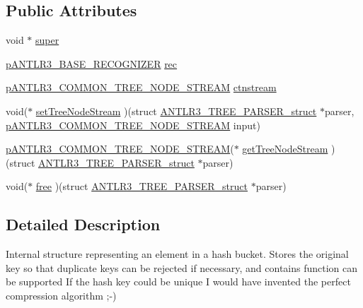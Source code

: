 \subsection*{Public Attributes}
\begin{DoxyCompactItemize}
\item 
void $\ast$ \hyperlink{struct_a_n_t_l_r3___t_r_e_e___p_a_r_s_e_r__struct_a747c1447b7ef0fc45034c6f25e1fdac0}{super}
\item 
\hyperlink{group___a_n_t_l_r3___b_a_s_e___r_e_c_o_g_n_i_z_e_r_ga5aeeb8dcbf65f45605ae07cbd618e24c}{p\-A\-N\-T\-L\-R3\-\_\-\-B\-A\-S\-E\-\_\-\-R\-E\-C\-O\-G\-N\-I\-Z\-E\-R} \hyperlink{struct_a_n_t_l_r3___t_r_e_e___p_a_r_s_e_r__struct_a2c91ea97da3628675b73dfd0818f697c}{rec}
\item 
\hyperlink{antlr3interfaces_8h_ad34592f16adc9c3df7eda33f9e35cd87}{p\-A\-N\-T\-L\-R3\-\_\-\-C\-O\-M\-M\-O\-N\-\_\-\-T\-R\-E\-E\-\_\-\-N\-O\-D\-E\-\_\-\-S\-T\-R\-E\-A\-M} \hyperlink{struct_a_n_t_l_r3___t_r_e_e___p_a_r_s_e_r__struct_a3c4fe4428b6684ed143062869673d215}{ctnstream}
\item 
void($\ast$ \hyperlink{struct_a_n_t_l_r3___t_r_e_e___p_a_r_s_e_r__struct_adb9beda70b2f18a08f6d9ed1ba93176b}{set\-Tree\-Node\-Stream} )(struct \hyperlink{struct_a_n_t_l_r3___t_r_e_e___p_a_r_s_e_r__struct}{A\-N\-T\-L\-R3\-\_\-\-T\-R\-E\-E\-\_\-\-P\-A\-R\-S\-E\-R\-\_\-struct} $\ast$parser, \hyperlink{antlr3interfaces_8h_ad34592f16adc9c3df7eda33f9e35cd87}{p\-A\-N\-T\-L\-R3\-\_\-\-C\-O\-M\-M\-O\-N\-\_\-\-T\-R\-E\-E\-\_\-\-N\-O\-D\-E\-\_\-\-S\-T\-R\-E\-A\-M} input)
\item 
\hyperlink{antlr3interfaces_8h_ad34592f16adc9c3df7eda33f9e35cd87}{p\-A\-N\-T\-L\-R3\-\_\-\-C\-O\-M\-M\-O\-N\-\_\-\-T\-R\-E\-E\-\_\-\-N\-O\-D\-E\-\_\-\-S\-T\-R\-E\-A\-M}($\ast$ \hyperlink{struct_a_n_t_l_r3___t_r_e_e___p_a_r_s_e_r__struct_a13ab4351ee6aaf51e18e26f2bddc109d}{get\-Tree\-Node\-Stream} )(struct \hyperlink{struct_a_n_t_l_r3___t_r_e_e___p_a_r_s_e_r__struct}{A\-N\-T\-L\-R3\-\_\-\-T\-R\-E\-E\-\_\-\-P\-A\-R\-S\-E\-R\-\_\-struct} $\ast$parser)
\item 
void($\ast$ \hyperlink{struct_a_n_t_l_r3___t_r_e_e___p_a_r_s_e_r__struct_a6b8657813c59e7f06b6a8f4ad6a0d240}{free} )(struct \hyperlink{struct_a_n_t_l_r3___t_r_e_e___p_a_r_s_e_r__struct}{A\-N\-T\-L\-R3\-\_\-\-T\-R\-E\-E\-\_\-\-P\-A\-R\-S\-E\-R\-\_\-struct} $\ast$parser)
\end{DoxyCompactItemize}


\subsection{Detailed Description}
Internal structure representing an element in a hash bucket. Stores the original key so that duplicate keys can be rejected if necessary, and contains function can be supported If the hash key could be unique I would have invented the perfect compression algorithm ;-\/) 


